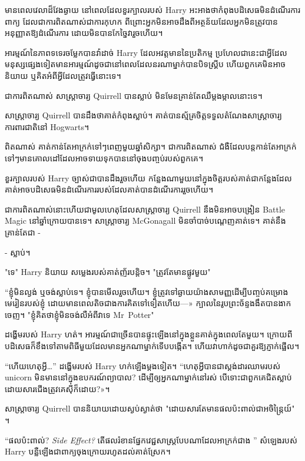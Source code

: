 មានពេលវេលាដ៏វែងឆ្ងាយ នៅពេលដែលខួរក្បាលរបស់ Harry អះអាងថាកំពុងបដិសេធមិនដំណើរការពាក្យ ដែលជាការពិតណាស់ជាការកុហក ពីព្រោះអ្នកមិនអាចដឹងពីអត្ថន័យដែលអ្នកមិនត្រូវបានអនុញ្ញាតឱ្យដំណើរការ ដោយមិនបានកែច្នៃវារួចហើយ។

អារម្មណ៍នៃភាពទទេរចម្លែកបានវ៉ាដាច់ Harry ដែលអវត្តមាននៃប្រតិកម្ម ប្រហែលជានេះជាអ្វីដែលមនុស្សផ្សេងទៀតមានអារម្មណ៍ដូចជានៅពេលដែលនរណាម្នាក់បានបិទស្គ្រីប ហើយពួកគេមិនអាចនិយាយ ឬគិតអំពីអ្វីដែលត្រូវធ្វើនោះទេ។

ជាការពិតណាស់ សាស្រ្តាចារ្យ Quirrell បានស្លាប់ មិនមែនគ្រាន់តែឈឺម្តងម្កាលនោះទេ។

សាស្រ្តាចារ្យ Quirrell បានដឹងថាគាត់កំពុងស្លាប់។ គាត់​បាន​ស្ម័គ្រ​ចិត្ត​ទទួល​តំណែង​សាស្ត្រាចារ្យ​ការពារ​ជាតិ​នៅ Hogwarts។

ពិតណាស់ គាត់កាន់តែអាក្រក់ទៅៗពេញមួយឆ្នាំសិក្សា។ ជា​ការ​ពិត​ណាស់ ជំងឺ​ដែល​បន្ត​កាន់​តែ​អាក្រក់​ទៅ​ៗ​មាន​គោលដៅ​ដែល​អាច​ទាយ​ទុក​បាន​នៅ​ចុង​បញ្ចប់​របស់​ពួក​គេ។

ខួរក្បាលរបស់ Harry ច្បាស់ជាបានដឹងរួចហើយ កន្លែងណាមួយនៅក្នុងចិត្តរបស់គាត់ជាកន្លែងដែលគាត់អាចបដិសេធមិនដំណើរការរបស់ដែលគាត់បានដំណើរការរួចហើយ។

ជាការពិតណាស់នោះហើយជាមូលហេតុដែលសាស្រ្តាចារ្យ Quirrell នឹងមិនអាចបង្រៀន Battle Magic នៅឆ្នាំក្រោយបានទេ។ សាស្រ្តាចារ្យ McGonagall មិនចាំបាច់បណ្តេញគាត់ទេ។ គាត់នឹងគ្រាន់តែជា -

- ស្លាប់។

"ទេ" Harry និយាយ សម្លេងរបស់គាត់ញ័របន្តិច។ "ត្រូវតែមានផ្លូវមួយ"

“ខ្ញុំ​មិន​ល្ងង់ ឬ​ចង់​ស្លាប់​ទេ។ ខ្ញុំបានមើលរួចហើយ។ ខ្ញុំ​ត្រូវ​ទៅ​ឆ្ងាយ​យ៉ាង​សាមញ្ញ​ដើម្បី​បញ្ចប់​គម្រោង​មេរៀន​របស់​ខ្ញុំ ដោយ​មាន​ពេល​តិច​ជាង​ការ​គិត​ទៅ​ទៀត​ហើយ—» ក្បាល​នៃ​រូប​ព្រះច័ន្ទ​ងងឹត​បាន​ងាក​ចេញ។ "ខ្ញុំគិតថាខ្ញុំមិនចង់លឺអំពីវាទេ Mr~Potter"

ដង្ហើមរបស់ Harry ហត់។ អារម្មណ៍ជាច្រើនបានផ្ទុះឡើងនៅក្នុងខ្លួនគាត់ក្នុងពេលតែមួយ។ ក្រោយ​ពី​បដិសេធ​ក៏​ខឹង​ទៅ​តាម​ពិធី​មួយ​ដែល​មាន​អ្នក​ណា​ម្នាក់​ទើប​បង្កើត។ ហើយ​វា​ហាក់​ដូច​ជា​គួរ​ឱ្យ​ភ្ញាក់​ផ្អើល។

“ហើយហេតុអ្វី…” ដង្ហើមរបស់ Harry ហក់ឡើងម្តងទៀត។ “ហេតុ​អ្វី​បាន​ជា​ស្តង់ដារ​ឈាម​របស់ unicorn មិន​មាន​នៅ​ក្នុង​ឧបករណ៍​ព្យាបាល? ដើម្បី​ឲ្យ​អ្នក​ណា​ម្នាក់​នៅ​រស់ បើ​ទោះ​ជា​ពួកគេ​ជិត​ស្លាប់​ដោយសារ​ជើង​ត្រូវ​គេ​ស៊ី​ក៏​ដោយ?»។

សាស្ត្រាចារ្យ Quirrell បាននិយាយដោយស្ងប់ស្ងាត់ថា "ដោយសារតែមានផលប៉ះពាល់ជាអចិន្ត្រៃយ៍" ។

“ផលប៉ះពាល់? \emph{Side Effect?} តើផលរំខានផ្នែកវេជ្ជសាស្រ្តបែបណាដែលអាក្រក់ជាង ” សំឡេងរបស់ Harry បន្លឺឡើងជាពាក្យចុងក្រោយរហូតដល់គាត់ស្រែក។

